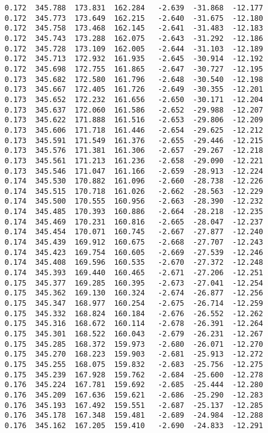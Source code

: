 \begin{verbatim}
   0.172  345.788  173.831  162.284   -2.639  -31.868  -12.177
   0.172  345.773  173.649  162.215   -2.640  -31.675  -12.180
   0.172  345.758  173.468  162.145   -2.641  -31.483  -12.183
   0.172  345.743  173.288  162.075   -2.643  -31.292  -12.186
   0.172  345.728  173.109  162.005   -2.644  -31.103  -12.189
   0.172  345.713  172.932  161.935   -2.645  -30.914  -12.192
   0.172  345.698  172.755  161.865   -2.647  -30.727  -12.195
   0.173  345.682  172.580  161.796   -2.648  -30.540  -12.198
   0.173  345.667  172.405  161.726   -2.649  -30.355  -12.201
   0.173  345.652  172.232  161.656   -2.650  -30.171  -12.204
   0.173  345.637  172.060  161.586   -2.652  -29.988  -12.207
   0.173  345.622  171.888  161.516   -2.653  -29.806  -12.209
   0.173  345.606  171.718  161.446   -2.654  -29.625  -12.212
   0.173  345.591  171.549  161.376   -2.655  -29.446  -12.215
   0.173  345.576  171.381  161.306   -2.657  -29.267  -12.218
   0.173  345.561  171.213  161.236   -2.658  -29.090  -12.221
   0.173  345.546  171.047  161.166   -2.659  -28.913  -12.224
   0.174  345.530  170.882  161.096   -2.660  -28.738  -12.226
   0.174  345.515  170.718  161.026   -2.662  -28.563  -12.229
   0.174  345.500  170.555  160.956   -2.663  -28.390  -12.232
   0.174  345.485  170.393  160.886   -2.664  -28.218  -12.235
   0.174  345.469  170.231  160.816   -2.665  -28.047  -12.237
   0.174  345.454  170.071  160.745   -2.667  -27.877  -12.240
   0.174  345.439  169.912  160.675   -2.668  -27.707  -12.243
   0.174  345.423  169.754  160.605   -2.669  -27.539  -12.246
   0.174  345.408  169.596  160.535   -2.670  -27.372  -12.248
   0.174  345.393  169.440  160.465   -2.671  -27.206  -12.251
   0.175  345.377  169.285  160.395   -2.673  -27.041  -12.254
   0.175  345.362  169.130  160.324   -2.674  -26.877  -12.256
   0.175  345.347  168.977  160.254   -2.675  -26.714  -12.259
   0.175  345.332  168.824  160.184   -2.676  -26.552  -12.262
   0.175  345.316  168.672  160.114   -2.678  -26.391  -12.264
   0.175  345.301  168.522  160.043   -2.679  -26.231  -12.267
   0.175  345.285  168.372  159.973   -2.680  -26.071  -12.270
   0.175  345.270  168.223  159.903   -2.681  -25.913  -12.272
   0.175  345.255  168.075  159.832   -2.683  -25.756  -12.275
   0.175  345.239  167.928  159.762   -2.684  -25.600  -12.278
   0.176  345.224  167.781  159.692   -2.685  -25.444  -12.280
   0.176  345.209  167.636  159.621   -2.686  -25.290  -12.283
   0.176  345.193  167.492  159.551   -2.687  -25.137  -12.285
   0.176  345.178  167.348  159.481   -2.689  -24.984  -12.288
   0.176  345.162  167.205  159.410   -2.690  -24.833  -12.291

\end{verbatim}
